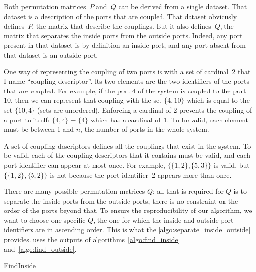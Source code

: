 Both permutation matrices~$P$ and~$Q$ can be derived from a single dataset.
That dataset is a description of the ports that are coupled.
That dataset obviously defines~$P$, the matrix that describe the couplings.
But it also defines~$Q$, the matrix that separates the inside ports from the outside ports.
Indeed, any port present in that dataset is by definition an inside port, and any port absent from that dataset is an outside port.

One way of representing the coupling of two ports is with a set of cardinal~2 that I name ``coupling descriptor''.
Its two elements are the two identifiers of the ports that are coupled.
For example, if the port 4 of the system is coupled to the port 10, then we can represent that coupling with the set $\lbrace 4, 10\rbrace$ which is equal to the set $\lbrace 10, 4\rbrace$ (sets are unordered).
Enforcing a cardinal of 2 prevents the coupling of a port to itself: $\lbrace 4, 4\rbrace = \lbrace 4\rbrace$ which has a cardinal of~1.
To be valid, each element must be between 1 and $n$, the number of ports in the whole system.

A set of coupling descriptors defines all the couplings that exist in the system.
To be valid, each of the coupling descriptors that it contains must be valid, and each port identifier can appear at most once.
For example,
$\lbrace \lbrace 1, 2 \rbrace, \lbrace 5, 3 \rbrace \rbrace$
is valid, but 
$\lbrace \lbrace 1, 2 \rbrace, \lbrace 5, 2 \rbrace \rbrace$
is not because the port identifier~2 appears more than once.

There are many possible permutation matrices $Q$: all that is required for $Q$ is to separate the inside ports from the outside ports, there is no constraint on the order of the ports beyond that.
To ensure the reproducibility of our algorithm, we want to choose one specific $Q$, the one for which the inside and outside port identifiers are in ascending order.
This is what the \cref{algo:separate_inside_outside} provides.
 uses the outputs of algorithms~\ref{algo:find_inside} and~\ref{algo:find_outside}.

\begin{algorithm}
    \caption{FindInside}
    \label{algo:find_inside}
    \begin{algorithmic}
         
        \EndFor
        \\  
        \EndFunction
    \end{algorithmic}
\end{algorithm}

